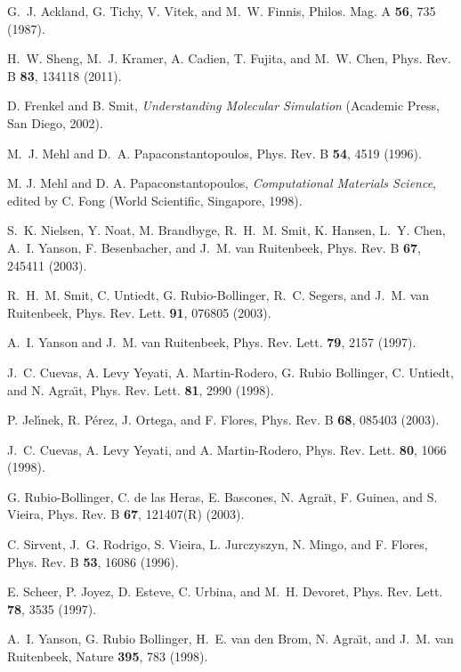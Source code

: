 \documentclass[aps,amsmath,amssymb,twocolumn,showpacs]{revtex4-1}
\begin{document}
\begin{thebibliography}{00}
G.~J. Ackland, G. Tichy, V. Vitek, and M.~W. Finnis, 
Philos. Mag. A {\bf 56}, 735 (1987).

H.~W. Sheng, M.~J. Kramer, A. Cadien, T. Fujita, and M.~W. Chen, 
Phys. Rev. B {\bf 83}, 134118 (2011).

D. Frenkel and B. Smit, 
\emph{Understanding Molecular Simulation} (Academic Press, San Diego, 2002).

M.~J. Mehl and D.~A. Papaconstantopoulos,
Phys. Rev. B {\bf 54}, 4519 (1996).

M. J. Mehl and D. A. Papaconstantopoulos, 
\emph{Computational Materials Science}, edited by C. Fong 
(World Scientific, Singapore, 1998).

S.~K. Nielsen, Y. Noat, M. Brandbyge, R.~H.~M. Smit, K. Hansen, L.~Y. Chen, 
A.~I. Yanson, F. Besenbacher, and J.~M. van Ruitenbeek, 
Phys. Rev. B {\bf 67}, 245411 (2003).

R.~H.~M. Smit, C. Untiedt, G. Rubio-Bollinger, R.~C. Segers, and J.~M. van Ruitenbeek,
Phys. Rev. Lett. {\bf 91}, 076805 (2003).

A.~I. Yanson and J.~M. van Ruitenbeek,
Phys. Rev. Lett. {\bf 79}, 2157 (1997).

J.~C. Cuevas, A. Levy Yeyati, A. Martin-Rodero, G. Rubio Bollinger,
C. Untiedt, and N. Agra\"{\i}t,
Phys. Rev. Lett. {\bf 81}, 2990 (1998).

P. Jel\'{\i}nek, R. P\'erez, J. Ortega, and F. Flores,
Phys. Rev. B {\bf 68}, 085403 (2003).

J.~C. Cuevas, A. Levy Yeyati, and A. Martin-Rodero,
Phys. Rev. Lett. {\bf 80}, 1066 (1998).

G. Rubio-Bollinger, C. de las Heras, E. Bascones, N. Agra\"it, F. Guinea, and S. Vieira,
Phys. Rev. B {\bf 67}, 121407(R) (2003).

C. Sirvent, J.~G. Rodrigo, S. Vieira, L. Jurczyszyn, N. Mingo, and F. Flores, 
Phys. Rev. B {\bf 53}, 16086  (1996).

E. Scheer, P. Joyez, D. Esteve, C. Urbina, and M.~H. Devoret,
Phys. Rev. Lett. {\bf 78}, 3535 (1997).

A.~I. Yanson, G. Rubio Bollinger, H.~E. van den Brom, N. Agra\"{\i}t, and J.~M. van Ruitenbeek, 
Nature {\bf 395}, 783 (1998).


\end{thebibliography}
\end{document}
